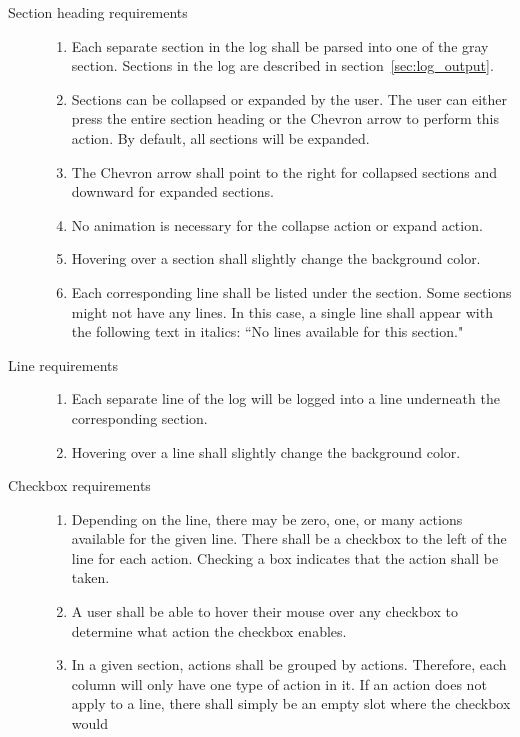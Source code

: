 \begin{description}
\item[Section heading requirements] \hfill
\begin{enumerate}
  \item Each separate section in the log shall be parsed into one of the gray
  section.  Sections in the log are described in section~\ref{sec:log_output}.
  \item Sections can be collapsed or expanded by the user.  The user can either
  press the entire section heading or the Chevron arrow to perform this action.
  By default, all sections will be expanded.
  \item The Chevron arrow shall point to the right for collapsed sections and
  downward for expanded sections.
  \item No animation is necessary for the collapse action or expand action.
  \item Hovering over a section shall slightly change the background color.
  \item Each corresponding line shall be listed under the section.  Some
  sections might not have any lines.  In this case, a single line shall appear
  with the following text in italics: ``No lines available for this section."
\end{enumerate}
\item[Line requirements] \hfill
\begin{enumerate}
  \item Each separate line of the log will be logged into a line underneath the
  corresponding section.
  \item Hovering over a line shall slightly change the background color.
\end{enumerate}
\item[Checkbox requirements] \hfill
\begin{enumerate}
  \item Depending on the line, there may be zero, one, or many actions available
  for the given line.  There shall be a checkbox to the left of the line for
  each action.  Checking a box indicates that the action shall be taken.
  \item A user shall be able to hover their mouse over any checkbox to
  determine what action the checkbox enables.
  \item In a given section, actions shall be grouped by actions.  Therefore,
  each column will only have one type of action in it.  If an action does not
  apply to a line, there shall simply be an empty slot where the checkbox would

\end{enumerate}
\end{description}
